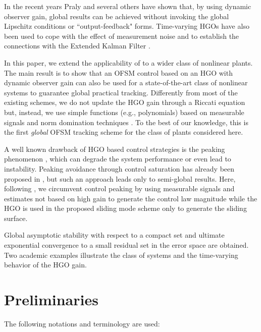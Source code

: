 \documentclass{rncauth}
\begin{document}
In the recent years Praly and several others have shown that, by
using dynamic observer gain, global results can be achieved
without invoking the global Lipschitz conditions or
``output-feedback" forms. Time-varying HGOs have also been used to cope with the effect of
measurement noise and to establish the connections with the
Extended Kalman Filter \cite{AK:07}\cite{AK:09}.

In this paper, we extend the applicability of \cite{PHCL:2007} to a wider class of nonlinear plants. 
The main result is to show that an OFSM control
based on an HGO with dynamic observer gain can also be used for a
state-of-the-art class of nonlinear systems to guarantee global
practical tracking. Differently from most of the existing schemes,
we do not update the HGO gain through a Riccati equation
\cite{P:01}\cite{P:07}\cite{GAL:06} but, instead, we use simple
 functions (e.g., polynomials) based on measurable signals and norm
domination techniques \cite{LL:05}\cite{P:07}\cite{APA:09}. To the
best of our knowledge, this is the first {\em global} OFSM tracking
scheme for the class of plants considered here.

A well known drawback of HGO based control strategies is the
peaking phenomenon \cite{SK:91}, which can degrade the system
performance or even lead to instability. Peaking avoidance through
control saturation has already been proposed in
\cite{OK:97}\cite{EK:92}, but such an approach leads only to
semi-global results. Here, following \cite{CHCL:2005}, we
circumvent control peaking by using measurable signals and
estimates not based on high gain to generate the control law
magnitude while the HGO is used in the proposed sliding mode
scheme only to generate the sliding surface.

Global asymptotic stability with respect to a compact set  and
ultimate exponential convergence to a small residual set in the
error space are obtained. Two academic examples illustrate the class
of systems and the time-varying behavior of the HGO gain.


\section{Preliminaries}%
\label{sec:preliminaries}
The following notations and terminology are used:%


\end{document}

